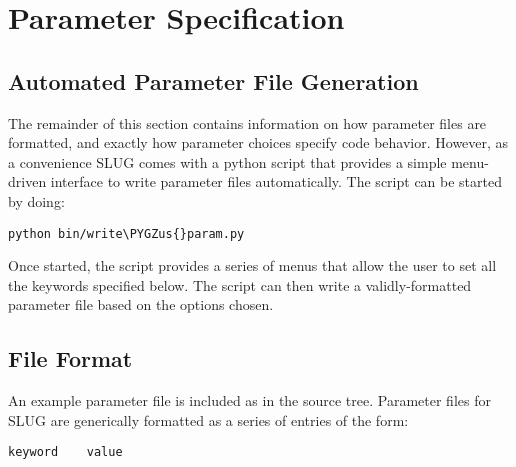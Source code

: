 \documentclass[letterpaper,10pt,english]{sphinxmanual}
\def\PYGZus{\char`\_}
\begin{document}
\chapter{Parameter Specification}
\label{parameters:sec-parameters}\label{parameters::doc}\label{parameters:parameter-specification}

\section{Automated Parameter File Generation}
\label{parameters:automated-parameter-file-generation}
The remainder of this section contains information on how parameter files are formatted, and exactly how parameter choices specify code behavior. However, as a convenience SLUG comes with a python script that provides a simple menu-driven interface to write parameter files automatically. The script can be started by doing:

\begin{Verbatim}[commandchars=\\\{\}]
python bin/write\PYGZus{}param.py
\end{Verbatim}

Once started, the script provides a series of menus that allow the user to set all the keywords specified below. The script can then write a validly-formatted parameter file based on the options chosen.


\section{File Format}
\label{parameters:file-format}
An example parameter file is included as  in the source tree. Parameter files for SLUG are generically formatted as a series of entries of the form:

\begin{Verbatim}[commandchars=\\\{\}]
keyword    value
\end{Verbatim}
\end{document}
